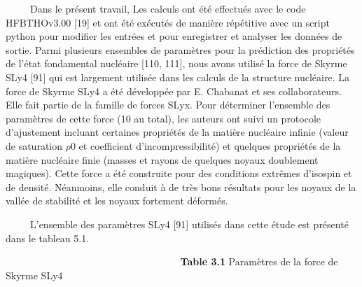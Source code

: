 \documentclass[a4paper]{article}
\begin{document}
\bigskip

\ \ \ \ \ Dans le présent travail, Les calculs ont été effectués avec le code HFBTHOv3.00 [19] et ont été exécutés de
manière répétitive avec un script python pour modifier les entrées et pour enregistrer et analyser les données de
sortie. Parmi plusieurs ensembles de paramètres pour la prédiction des propriétés de l’état fondamental nucléaire [110,
111], nous avons utilisé la force de Skyrme SLy4 [91] qui est largement utilisée dans les calculs de la structure
nucléaire. La force de Skyrme SLy4 a été développée par E. Chabanat et ses collaborateurs. Elle fait partie de la
famille de forces SLyx. Pour déterminer l’ensemble des paramètres de cette force (10 au total), les auteurs ont suivi
un protocole d’ajustement incluant certaines propriétés de la matière nucléaire infinie (valeur de saturation $\rho $0
et coefficient d’incompressibilité) et quelques propriétés de la matière nucléaire finie (masses et rayons de quelques
noyaux doublement magiques). Cette force a été construite pour des conditions extrêmes d’isospin et de densité.
Néanmoins, elle conduit à de très bons résultats pour les noyaux de la vallée de stabilité et les noyaux fortement
déformés.

\ \ \ \ \ L’ensemble des paramètres SLy4 [91] utilisés dans cette étude est présenté dans le tableau 5.1.


\bigskip


\bigskip


\bigskip


\bigskip


\bigskip


\bigskip


\bigskip


\bigskip


\bigskip


\bigskip


\bigskip


\bigskip

\textbf{\ \ \ \ \ \ \ \ \ \ \ \ \ \ \ \ \ \ \ \ \ \ \ \ \ \ \ \ \ \ \ Table 3.1 }Paramètres de la force de Skyrme SLy4


\bigskip
\end{document}
